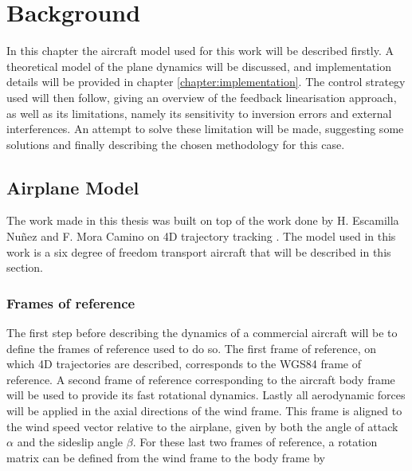 
\chapter{Background}
\label{chapter:background}

In this chapter the aircraft model used for this work will be described firstly. A theoretical model of the plane dynamics will be discussed, and implementation details will be provided in chapter \ref{chapter:implementation}. The control strategy used will then follow, giving an overview of the feedback linearisation approach, as well as its limitations, namely its sensitivity to inversion errors and external interferences. An attempt to solve these limitation will be made, suggesting some solutions and finally describing the chosen methodology for this case.



\section{Airplane Model}
\label{section:background/model}

The work made in this thesis was built on top of the work done by H. Escamilla Nuñez and  F. Mora Camino on 4D trajectory tracking \cite{hector}. The model used in this work is a six degree of freedom transport aircraft that will be described in this section. 

\subsection{Frames of reference}
\label{section:background/model/for}
The first step before describing the dynamics of a commercial aircraft will be to define the frames of reference used to do so. The first frame of reference, on which 4D trajectories are described, corresponds to the WGS84 frame of reference. A second frame of reference corresponding to the aircraft body frame will be used to provide its fast rotational dynamics. Lastly all aerodynamic forces will be applied in the axial directions of the wind frame. This frame is aligned to the wind speed vector relative to the airplane, given by both the angle of attack $\alpha$ and the sideslip angle $\beta$. For these last two frames of reference, a rotation matrix can be defined from the wind frame to the body frame by


